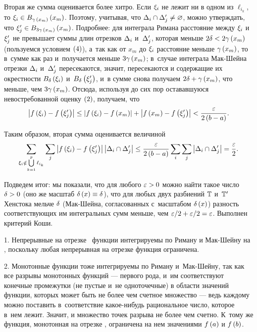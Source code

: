 \documentclass[draft]{article}
\begin{document}
Вторая же сумма оценивается более хитро. Если $\xi_i$ не лежит ни в
одном из $\ell_{i_k}$, то $\xii\in B_{\gamma\,\at(x_m)}\at(x_m)$.
Поэтому, учитывая, что $\Delta_i\cap\Delta'_j\neq\varnothing$, можно
утверждать, что $\xij\in B_{3\gamma\,\at(x_m)}\at(x_m)$. Подробнее:
для интеграла Римана расстояние между $\xi_i$ и~$\xi'_j$ не превышает
суммы длин отрезков $\Delta_i$ и~$\Delta'_j$, которая меньше
$2\de<2\gamma\at(x_m)$ (пользуемся условием $\at(4)$), а~так как от
$x_m$ до $\xi_i$ расстояние меньше $\gamma\at(x_m)$, то в~сумме как
раз и~получается меньше $3\gamma\at(x_m)$; в~случае интеграла
Мак-Шейна отрезки $\Delta_i$ и~$\Delta'_j$ пересекаются, значит, пересекаются
и содержащие их окрестности $B_\de\at(\xii)$ и~$B_\de\at(\xij)$, и~в
сумме снова получаем $2\de+\gamma\at(x_m)$, что меньше, чем
$3\gamma\at(x_m)$. Отсюда, используя до сих пор остававшуюся
невостребованной оценку $\at(2)$, получаем, что
$$\abs{f\at(\xii)-f\at(\xij)}\le\abs{f\at(\xii)-f\at(x_m)}+
\abs{f\at(x_m)-f\at(\xij)}<{\ep\over2\at(b-a)}.$$

Таким образом, вторая сумма оценивается величиной
$$\sum\limits_{\xii\notin \bigcup\limits_{k=1}^p \ell_{i_k}}    \sumj
\abs{f\at(\xii)-f\at(\xij)}\abs{\dei\cap\dej}\le{\ep\over2\at(b-a)}
\sumi\sumj\abs{\dei\cap\dej}={\ep\over2}.$$

\eject

Подведем итог: мы показали, что для любого $\varepsilon > 0$ можно найти такое
число $\delta > 0$ (оно же масштаб $\dex\equiv\de$), что для любых двух
разбиений $\mathbb{T}$ и~$\mathbb{T}'$ Хенстока мельче $\delta$ (Мак-Шейна,
согласованных с~масштабом $\dex$) разность соответствующих им
интегральных сумм меньше, чем $\varepsilon/2+\varepsilon/2=\varepsilon$. Выполнен критерий
Коши.

\prtm

\bigskip

\imps

\smallskip

1. Непрерывные на отрезке \ab\ функции интегрируемы по Риману и
Мак-Шейну на \ab, поскольку любая непрерывная на отрезке функция
ограничена.

\smallskip

2. Монотонные функции тоже интегрируемы по Риману и~Мак-Шейну, так
как все разрывы монотонных функций --- первого рода, и~им
соответствуют конечные промежутки (не пустые и~не одноточечные) в
области значений функции, которых может быть не более чем счетное
множество --- ведь каждому можно поставить в~соответствие
какое-нибудь рациональное число, которое в~нем лежит. Значит, и
множество точек разрыва не более чем счетно. К~тому же функция,
монотонная на отрезке \ab, ограничена на нем значениями $f\at(a)$ и
$f\at(b)$.
\end{document}
